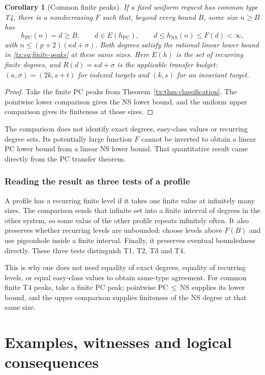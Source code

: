 \documentclass[11pt,a4paper,oneside,openany]{book}
\newtheorem{corollary}[theorem]{Corollary}
\theoremstyle{definition}\newtheorem{definition}[theorem]{Definition}
\theoremstyle{remark}\newtheorem{remark}[theorem]{Remark}
\newcommand{\NS}{\mathrm{NS}}\newcommand{\PC}{\mathrm{PC}}
\numberwithin{equation}{chapter}
\begin{document}
\begin{corollary}[Common finite peaks]\label{tx:cor:common-peaks}
If a fixed uniform request has common type T4, there is a nondecreasing
$F$ such that, beyond every bound $B$, some size $n\ge B$ has
\[
 h_{\PC}(n)=d\ge B,\qquad d\in E(h_{\PC}),\qquad
 d\le h_{\NS}(n)\le F(d)<\infty,
\]
with $n\le(p+2)(\kappa d+\sigma)$. Both degrees satisfy the rational
linear lower bound in \eqref{tx:eq:finite-peaks} at these same sizes.
Here $E(h)$ is the set of recurring finite degrees, and
$R(d)=\kappa d+\sigma$ is the applicable transfer budget: $(\kappa,\sigma)
=(2k,s+t)$ for indexed targets and $(k,s)$ for an invariant target.
\end{corollary}
\begin{proof}
Take the finite PC peaks from Theorem~\ref{tx:thm:classification}.
The pointwise lower comparison gives the NS lower bound, and the uniform
upper comparison gives its finiteness at those sizes.
\end{proof}

The comparison does not identify exact degrees, easy-class values or
recurring degree sets. Its potentially large function $F$ cannot be
inverted to obtain a linear PC lower bound from a linear NS lower bound.
That quantitative result came directly from the PC transfer theorem.

\section{Reading the result as three tests of a profile}
A profile has a recurring finite level if it takes one finite value at
infinitely many sizes. The comparison sends that infinite set into a
finite interval of degrees in the other system, so some value of the
other profile repeats infinitely often. It also preserves whether
recurring levels are unbounded: choose levels above $F(B)$ and use
pigeonhole inside a finite interval. Finally, it preserves eventual
boundedness directly. These three tests distinguish T1, T2, T3 and T4.

This is why one does not need equality of exact degrees, equality of
recurring levels, or equal easy-class values to obtain same-type
agreement. For common finite T4 peaks, take a finite PC peak; pointwise
PC\,$\le$\,NS supplies its lower bound, and the upper comparison supplies
finiteness of the NS degree at that same size.

\part{Examples, witnesses and logical consequences}
\end{document}
